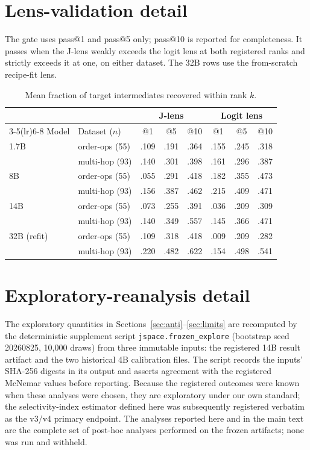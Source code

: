 \documentclass{article}
\newcommand{\jlens}{J-lens}
\begin{document}
\section{Lens-validation detail}
\label{app:lens}

The gate uses pass@1 and pass@5 only; pass@10 is reported for completeness. It passes when
the \jlens{} weakly exceeds the logit lens at both registered ranks and strictly exceeds it
at one, on either dataset. The 32B rows use the from-scratch recipe-fit lens.

\begin{table}[ht]
  \caption{Mean fraction of target intermediates recovered within rank $k$.}
  \label{tab:lens}
  \centering
  \small
  \begin{tabular}{llcccccc}
    \toprule
    & & \multicolumn{3}{c}{\jlens{}} & \multicolumn{3}{c}{Logit lens} \\
    \cmidrule(lr){3-5}\cmidrule(lr){6-8}
    Model & Dataset ($n$) & @1 & @5 & @10 & @1 & @5 & @10 \\
    \midrule
    1.7B & order-ops (55) & .109 & .191 & .364 & .155 & .245 & .318 \\
         & multi-hop (93) & .140 & .301 & .398 & .161 & .296 & .387 \\
    8B & order-ops (55) & .055 & .291 & .418 & .182 & .355 & .473 \\
       & multi-hop (93) & .156 & .387 & .462 & .215 & .409 & .471 \\
    14B & order-ops (55) & .073 & .255 & .391 & .036 & .209 & .309 \\
        & multi-hop (93) & .140 & .349 & .557 & .145 & .366 & .471 \\
    32B (refit) & order-ops (55) & .109 & .318 & .418 & .009 & .209 & .282 \\
        & multi-hop (93) & .220 & .482 & .622 & .154 & .498 & .541 \\
    \bottomrule
  \end{tabular}
\end{table}

\section{Exploratory-reanalysis detail}
\label{app:explore}

The exploratory quantities in Sections~\ref{sec:anti}--\ref{sec:limits} are recomputed by
the deterministic supplement script \texttt{jspace.frozen\_explore} (bootstrap seed
20260825, 10{,}000 draws) from three immutable inputs: the registered 14B result artifact
and the two historical 4B calibration files. The script records the inputs' SHA-256
digests in its output and asserts agreement with the registered McNemar values before
reporting. Because the registered outcomes were known when these analyses were chosen,
they are exploratory under our own standard; the selectivity-index estimator defined here
was subsequently registered verbatim as the v3/v4 primary endpoint. The analyses reported
here and in the main text are the complete set of post-hoc analyses performed on the
frozen artifacts; none was run and withheld.
\end{document}
